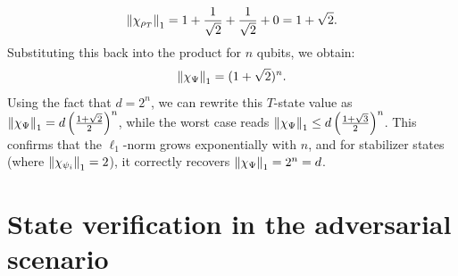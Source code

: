 \documentclass[a4paper,twocolumn,11pt,unpublished]{quantumarticle}
\begin{document}
\begin{equation}
    \left\lVert\chi_{\rho_T}\right\rVert_1 = 1 + \frac{1}{\sqrt{2}} + \frac{1}{\sqrt{2}} + 0 = 1 + \sqrt{2}.
\end{equation}
Substituting this back into the product for $n$ qubits, we obtain:
\begin{equation}
    \left\lVert\chi_\Psi\right\rVert_{1} = (1 + \sqrt{2})^n.
\end{equation}
Using the fact that $d = 2^n$, we can rewrite this $T$-state value as $\left\lVert\chi_\Psi\right\rVert_{1} = d \left( \frac{1+\sqrt{2}}{2} \right)^n$, while the worst case reads $\left\lVert\chi_\Psi\right\rVert_{1} \le d \left( \frac{1+\sqrt{3}}{2} \right)^n$. This confirms that the $\ell_1$-norm grows exponentially with $n$, and for stabilizer states (where $\left\lVert\chi_{\psi_i}\right\rVert_1 = 2$), it correctly recovers $\left\lVert\chi_\Psi\right\rVert_1 = 2^n = d$.

\section{State verification in the adversarial scenario}
\label{section:verification}
\end{document}
